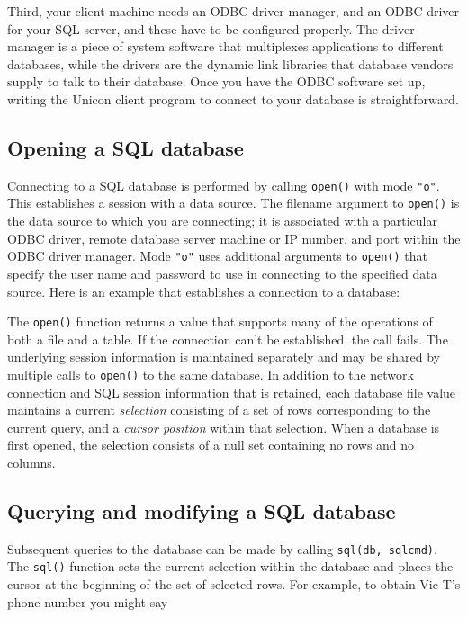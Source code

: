Third, your client machine needs an ODBC
driver manager, and an ODBC driver for your SQL server, and these have
to be configured properly. The driver manager is a piece of system
software that multiplexes applications to different databases, while
the drivers are the dynamic link libraries that database vendors supply
to talk to their database. Once you have the ODBC software set up,
writing the Unicon client program to connect to your database is
straightforward.

\subsection{Opening a SQL database}

Connecting to a SQL database is performed by calling \texttt{open()}
with mode \texttt{"o"}. This establishes a
session with a data source. The filename argument to \texttt{open()} is
the data source to which you are connecting; it is associated with a
particular ODBC driver, remote database server machine or IP number,
and port within the ODBC driver manager. Mode
\texttt{"o"} uses additional arguments to
\texttt{open()} that specify the user name and password to use in
connecting to the specified data source. Here is an example that
establishes a connection to a database:


The \texttt{open()} function returns a value that supports many of the
operations of both a file and a table. If the connection
can't be established, the call fails. The underlying
session information is maintained separately and may be shared by
multiple calls to \texttt{open()} to the same database. In addition to
the network connection and SQL session information that is retained,
each database file value maintains a current \textit{selection}
consisting of a set of rows corresponding to the current query, and a
\textit{cursor position} within that selection. When a database is
first opened, the selection consists of a null set containing no rows
and no columns.

\subsection{Querying and modifying a SQL database}

Subsequent queries to the database can be made by calling
\texttt{sql(db, sqlcmd)}. The \texttt{sql()} function sets
the current selection within the database and places the cursor at the
beginning of the set of selected rows. For example, to obtain Vic
T's phone number you might say

